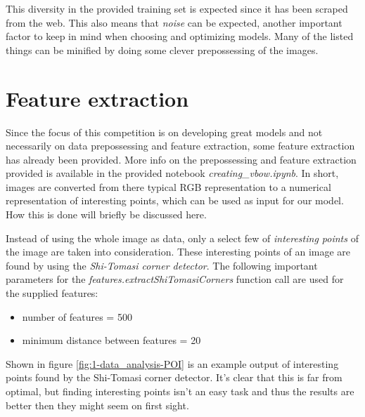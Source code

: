 This diversity in the provided training set is expected since it has been scraped from the web.
This also means that \emph{noise} can be expected, another important factor to keep in mind when choosing and optimizing models.
Many of the listed things can be minified by doing some clever prepossessing of the images.



\section{Feature extraction}
\label{section:DA_feature_extraction}

Since the focus of this competition is on developing great models and not necessarily on data prepossessing and feature extraction, some feature extraction has already been provided.
More info on the prepossessing and feature extraction provided is available in the provided notebook \emph{creating\_vbow.ipynb}.
In short, images are converted from there typical RGB representation to a numerical representation of interesting points, which can be used as input for our model.
How this is done will briefly be discussed here.

Instead of using the whole image as data, only a select few of \emph{interesting points} of the image are taken into consideration.
These interesting points of an image are found by using the \emph{Shi-Tomasi corner detector}.
The following important parameters for the \emph{features.extractShiTomasiCorners} function call are used for the supplied features:
\begin{itemize}
    \item number of features = 500
    \item minimum distance between features = 20
\end{itemize}

Shown in figure \ref{fig:1-data_analysis-POI} is an example output of interesting points found by the Shi-Tomasi corner detector.
It's clear that this is far from optimal, but finding interesting points isn't an easy task and thus the results are better then they might seem on first sight. 

